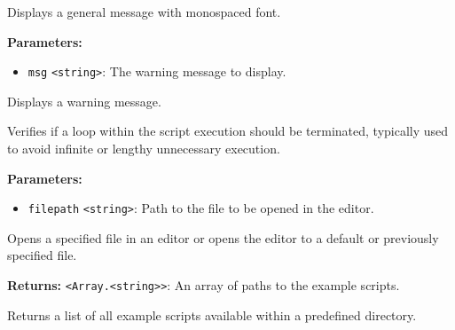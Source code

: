 \documentclass[12pt,a4paper]{article}
\begin{document}
\noindent Displays a general message with monospaced font.

\vspace{5mm}
\noindent {}


\noindent \textbf{Parameters:}
\begin{itemize}
  \item \texttt{msg} \texttt{<string>}: The warning message to display.
\end{itemize}

\noindent Displays a warning message.

\vspace{5mm}
\noindent {}


\noindent Verifies if a loop within the script execution should be terminated, typically used to avoid infinite or lengthy unnecessary execution.

\vspace{5mm}
\noindent {}


\noindent \textbf{Parameters:}
\begin{itemize}
  \item \texttt{filepath} \texttt{<string>}: Path to the file to be opened in the editor.
\end{itemize}

\noindent Opens a specified file in an editor or opens the editor to a default or previously specified file.

\vspace{5mm}
\noindent {}


\noindent \textbf{Returns:} \texttt{<Array.<string>>}: An array of paths to the example scripts.

\noindent Returns a list of all example scripts available within a predefined directory.

\vspace{5mm}
\noindent {}
\end{document}

